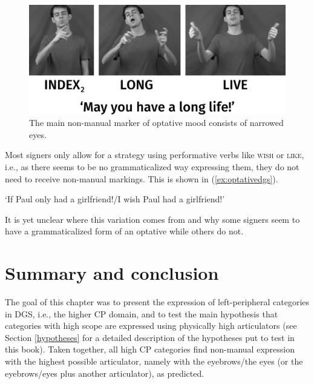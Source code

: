 \begin{figure}[bt]
\centering
	\includegraphics[width=1.0\textwidth]{optativesw.jpg}
	\caption{The main non-manual marker of optative mood consists of narrowed eyes.}
	\label{optativesnonmanuals}
\end{figure}

Most signers only allow for a strategy using performative verbs like \textsc{wish} or \textsc{like}, i.e., as there seems to be no grammaticalized way expressing them, they do not need to receive non-manual markings. This is shown in (\ref{ex:optativedgs}).

\begin{exe}

\glt `If Paul only had a girlfriend!/I wish Paul had a girlfriend!' \label{ex:optativedgs}

\end{exe} 

\noindent It is yet unclear where this variation comes from and why some signers seem to have a grammaticalized form of an optative while others do not.


\section{Summary and conclusion}
The goal of this chapter was to present the expression of left-peripheral categories in DGS, i.e., the higher CP domain, and to test the main hypothesis that categories with high scope are expressed using physically high articulators (see Section \ref{hypotheses} for a detailed description of the hypotheses put to test in this book). Taken together, all high CP categories find non-manual expression with the highest possible articulator, namely with the eyebrows/the eyes (or the eyebrows/eyes plus another articulator), as predicted. 

